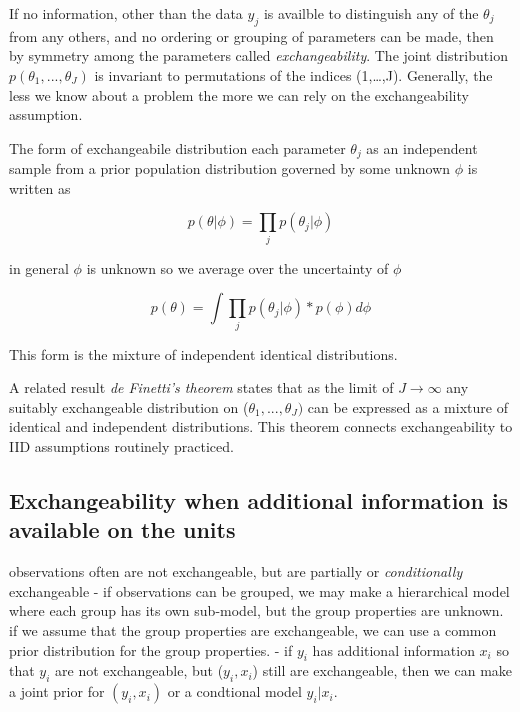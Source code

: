 \documentclass[
]{book}
\theoremstyle{definition}
\theoremstyle{definition}
\theoremstyle{definition}
\theoremstyle{definition}
\theoremstyle{remark}
\begin{document}
If no information, other than the data \(y_j\) is availble to distinguish any of the \(\theta_j\) from any others, and no ordering or grouping of parameters can be made, then by symmetry among the parameters called \emph{exchangeability}.
The joint distribution \(p(\theta_1,...,\theta_J)\) is invariant to permutations of the indices (1,\ldots,J). Generally, the less we know about a problem the more we can rely on the exchangeability assumption.

The form of exchangeabile distribution each parameter \(\theta_j\) as an independent sample from a prior population distribution governed by some unknown \(\phi\) is written as

\begin{equation}
p(\theta|\phi) = \prod_j p(\theta_j| \phi)
\label{eq:fiveOne}
\end{equation}

in general \(\phi\) is unknown so we average over the uncertainty of \(\phi\)

\begin{equation}
p(\theta) = \int \prod_j p(\theta_j| \phi)* p(\phi)d\phi
\end{equation}

This form is the mixture of independent identical distributions.

A related result \emph{de Finetti's theorem} states that as the limit of \(J\to \infty\) any suitably exchangeable distribution on (\(\theta_1,...,\theta_J)\) can be expressed as a mixture of identical and independent distributions. This theorem connects exchangeability to IID assumptions routinely practiced.

\hypertarget{exchangeability-when-additional-information-is-available-on-the-units}{%
\subsection*{Exchangeability when additional information is available on the units}\label{exchangeability-when-additional-information-is-available-on-the-units}}

observations often are not exchangeable, but are partially or \emph{conditionally} exchangeable
- if observations can be grouped, we may make a hierarchical model where each group has its own sub-model, but the group properties are unknown. if we assume that the group properties are exchangeable, we can use a common prior distribution for the group properties.
- if \(y_i\) has additional information \(x_i\) so that \(y_i\) are not exchangeable, but (\(y_i,x_i\)) still are exchangeable, then we can make a joint prior for \((y_i,x_i)\) or a condtional model \(y_i | x_i\).
\end{document}
